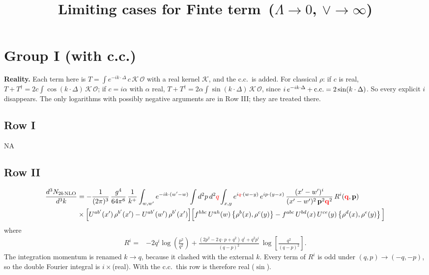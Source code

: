 \documentclass[9pt]{article}
\title{Limiting cases for Finte term\, ($\Lambda\to 0$, $\vee\to \infty$)}
\author{}
\date{}
\numberwithin{equation}{section}
\begin{document}
\maketitle
\section{Group I (with c.c.)}
{\color{red}\textbf{Reality.} Each term here is $T=\int e^{-ik\cdot\Delta}\,c\,\mathcal K\,\mathcal O$ with a real kernel $\mathcal K$, and the c.c.\ is added. For classical $\rho$: if $c$ is real, $T+T^{\dagger}=2c\int\cos(k\cdot\Delta)\,\mathcal K\,\mathcal O$; if $c=i\alpha$ with $\alpha$ real, $T+T^{\dagger}=2\alpha\int\sin(k\cdot\Delta)\,\mathcal K\,\mathcal O$, since $i\,e^{-ik\cdot\Delta}+{\rm c.c.}=2\sin(k\cdot\Delta)$. So every explicit $i$ disappears. The only logarithms with possibly negative arguments are in Row III; they are treated there.}
\subsection{Row I}
\textsc{NA}
\subsection{Row II}
\begin{align}
\frac{d^{3}N_{2b\,\rm NLO}}{d^{3}k} & = -\frac{1}{(2\pi)^{3}}\,\frac{g^{4}}{64\pi^{6}}\,\frac{1}{k^{+}}\int_{w,w'} e^{-ik\cdot(w'-w)}
\int d^{2}p\,d^{2}{\color{red}q}\int_{x,y} e^{i{\color{red}q}\cdot(w-y)}\,e^{ip\cdot(y-x)}\,\frac{(x'-w')^{i}}{(x'-w')^{2}\,\mathbf{p}^{2}{\color{red}\mathbf{q}}^{2}}\,R^{i}({\color{red}\mathbf{q}},\mathbf{p})\notag\\
&\times\Big[U^{ab'}(x')\,\rho^{b'}(x')-U^{ab'}(w')\,\rho^{b'}(x')\Big]
\Big[f^{hbc}\,U^{ah}(w)\left\{\rho^{b}(x),\rho^{c}(y)\right\}-f^{abc}\,U^{bd}(x)\,U^{ce}(y)\left\{\rho^{d}(x),\rho^{e}(y)\right\}\Big]
\end{align}
where
\begin{align}
R^{i} =& -2q^{i}\log\left(\frac{p^{2}}{q^{2}}\right)
+\frac{(2p^{2}-2\,q\cdot p+q^{2})\,q^{i}+q^{2}p^{i}}{(q-p)^{2}}\,
\log\left[\frac{q^{2}}{(q-p)^{2}}\right].
\end{align}
{\color{red}The integration momentum is renamed $k\to q$, because it clashed with the external $k$. Every term of $R^{i}$ is odd under $(q,p)\to(-q,-p)$, so the double Fourier integral is $i\times$(real). With the c.c.\ this row is therefore real ($\sin$).}
\end{document}

